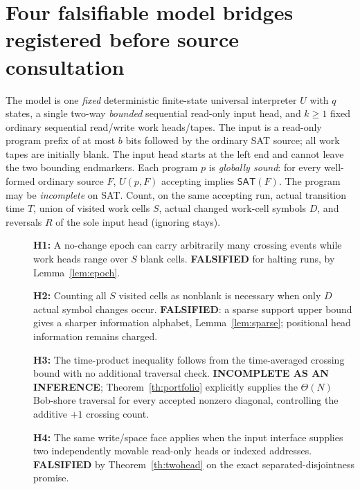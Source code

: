 \documentclass[11pt]{article}
\newcommand{\SAT}{\mathsf{SAT}}
\begin{document}
\section{Four falsifiable model bridges registered before source consultation}
The model is one \emph{fixed} deterministic finite-state universal interpreter
$U$ with $q$ states, a single two-way \emph{bounded} sequential read-only
input head, and $k\ge1$ fixed ordinary sequential read/write work heads/tapes.
The input is a read-only program prefix of at most $b$ bits followed by
the ordinary SAT source; all work tapes are initially blank. The input head
starts at the left end and cannot leave the two bounding endmarkers. Each
program $p$ is \emph{globally sound}: for every well-formed ordinary source
$F$, $U(p,F)$ accepting implies $\SAT(F)$. The program may be
\emph{incomplete} on SAT. Count, on the same accepting run, actual transition
time $T$, union of visited work cells $S$, actual changed work-cell symbols
$D$, and reversals $R$ of the sole input head (ignoring stays).
\begin{description}
\item[] \textbf{H1:} A no-change epoch can carry arbitrarily many crossing
events while work heads range over $S$ blank cells. \textbf{FALSIFIED} for
halting runs, by Lemma~\ref{lem:epoch}.
\item[] \textbf{H2:} Counting all $S$ visited cells as nonblank is necessary
when only $D$ actual symbol changes occur. \textbf{FALSIFIED}: a sparse
support upper bound gives a sharper information alphabet,
Lemma~\ref{lem:sparse}; positional head information remains charged.
\item[] \textbf{H3:} The time-product inequality follows from the
time-averaged crossing bound with no additional traversal check.
\textbf{INCOMPLETE AS AN INFERENCE}; Theorem~\ref{th:portfolio} explicitly
supplies the $\Theta(N)$ Bob-shore traversal for every accepted
nonzero diagonal, controlling the additive $+1$ crossing count.
\item[] \textbf{H4:} The same write/space face applies when the input
interface supplies two independently movable read-only heads or indexed
addresses. \textbf{FALSIFIED} by Theorem~\ref{th:twohead} on the exact
separated-disjointness promise.
\end{description}
\end{document}
